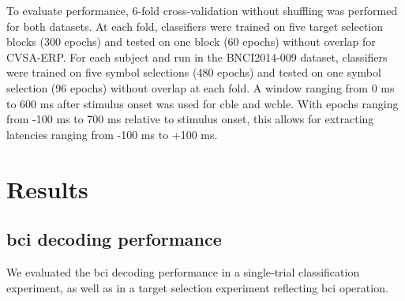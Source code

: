 To evaluate performance, 6-fold cross-validation without shuffling was performed for both
datasets.
At each fold, classifiers were trained on five target selection blocks (300
epochs) and tested on one block (60 epochs) without overlap for CVSA-ERP.
For each subject and run in the BNCI2014-009 dataset, classifiers
were trained on five symbol selections (480 epochs) and tested on one symbol
selection (96 epochs) without overlap at each fold.
A window ranging from 0 ms to 600 ms after stimulus onset was used for \ac{cble} and \ac{wcble}.
With epochs ranging from -100 ms to 700 ms relative to stimulus onset, this
allows for extracting latencies ranging from -100 ms to +100 ms.


\section{Results}

\subsection{\Acs{bci} decoding performance}%
\label{sec:covert-align/results/bloc-acc}

We evaluated the \ac{bci} decoding performance in a single-trial classification
experiment, as well as in a target selection experiment reflecting \ac{bci}
operation.

